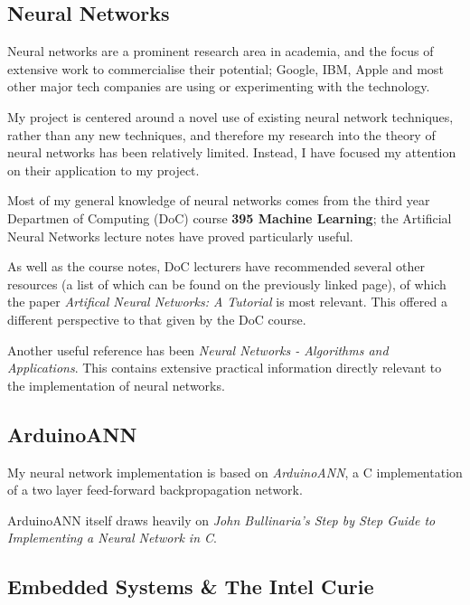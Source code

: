 \documentclass[a4paper]{article}
\begin{document}
\subsection{Neural Networks}%
\label{subsec:bg_neuralnetworks}

Neural networks are a prominent research area in academia, and the focus of extensive work to commercialise their potential; Google, IBM, Apple and most other major tech companies are using or experimenting with the technology.

My project is centered around a novel use of existing neural network techniques, rather than any new techniques, and therefore my research into the theory of neural networks has been relatively limited. Instead, I have focused my attention on their application to my project.

Most of my general knowledge of neural networks comes from the third year Departmen of Computing (DoC) course \textbf{395 Machine Learning}\cite{bgref0}; the Artificial Neural Networks lecture notes have proved particularly useful.

As well as the course notes, DoC lecturers have recommended several other resources (a list of which can be found on the previously linked page), of which the paper \textit{Artifical Neural Networks: A Tutorial}\cite{bgref1} is most relevant. This offered a different perspective to that given by the DoC course.

Another useful reference has been \textit{Neural Networks - Algorithms and Applications}\cite{bgref2}. This contains extensive practical information directly relevant to the implementation of neural networks.

\subsection{ArduinoANN}%
\label{subsec:bg_arduinoann}

My neural network implementation is based on \textit{ArduinoANN}\cite{bgref3}, a C implementation of a two layer feed-forward backpropagation network. 

ArduinoANN itself draws heavily on \textit{John Bullinaria's Step by Step Guide to Implementing a Neural Network in C}\cite{bgref4}.

\subsection{Embedded Systems \& The Intel Curie}%
\label{subsec:bg_embeddedsystems}
\end{document}
